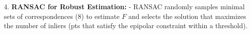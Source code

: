 4. \textbf{RANSAC for Robust Estimation:}
   - RANSAC randomly samples minimal sets of correspondences (8) to estimate \( F \) and selects the solution that maximizes the number of inliers (pts that satisfy the epipolar constraint within a threshold). \\



